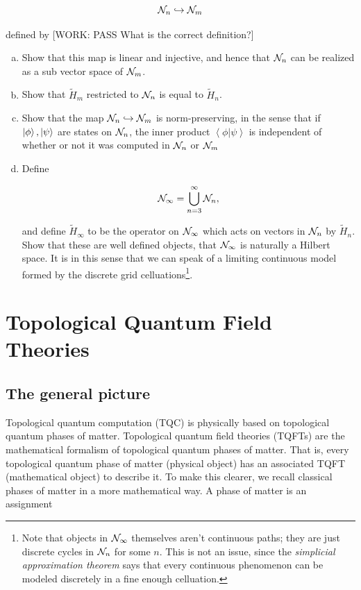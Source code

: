 \documentclass{article}
\theoremstyle{definition}
\numberwithin{figure}{section}
\begin{document}
\begin{enumerate}[\thesection .1.]
$$\mathcal{N}_{n}\hookrightarrow{}\mathcal{N}_{m}$$

defined by [WORK: PASS What is the correct definition?]

\begin{enumerate}[(a)]
\item Show that this map is linear and injective, and hence that $\mathcal{N}_{n}$ can be realized as a sub vector space of $\mathcal{N}_{m}$.

\item Show that $\tilde{H}_{m}$ restricted to $\mathcal{N}_{n}$ is equal to $\tilde{H}_n$.

\item  Show that the map $\mathcal{N}_{n}\hookrightarrow{}\mathcal{N}_{m}$ is norm-preserving, in the sense that if $\left|\phi\right>,\left|\psi\right>$ are states on $\mathcal{N}_{n}$, the inner product $\left<\phi | \psi \right>$ is independent of whether or not it was computed in $\mathcal{N}_{n}$ or $\mathcal{N}_{m}$

\item Define

$$\mathcal{N}_{\infty}=\bigcup_{n=3}^{\infty}\mathcal{N}_{n},$$

and define $\tilde{H}_{\infty}$ to be the operator on $\mathcal{N}_{\infty}$ which acts on vectors in $\mathcal{N}_{n}$ by $\tilde{H}_n$. Show that these are well defined objects, that $\mathcal{N}_{\infty}$ is naturally a Hilbert space. It is in this sense that we can speak of a limiting continuous model formed by the discrete grid celluations\footnote{Note that objects in $\mathcal{N}_{\infty}$ themselves aren't continuous paths; they are just discrete cycles in $\mathcal{N}_n$ for some $n$. This is not an issue, since the \textit{simplicial approximation theorem} says that every continuous phenomenon can be modeled discretely in a fine enough celluation.}.
\end{enumerate}
\end{enumerate}

\section{Topological Quantum Field Theories}
\label{TQFTs}

\subsection{The general picture}
\label{The general picture}

Topological quantum computation (TQC) is physically based on topological quantum phases of matter. Topological quantum field theories (TQFTs) are the mathematical formalism of topological quantum phases of matter. That is, every topological quantum phase of matter (physical object) has an associated TQFT (mathematical object) to describe it. To make this clearer, we recall classical phases of matter in a more mathematical way. A phase of matter is an assignment
\end{document}
